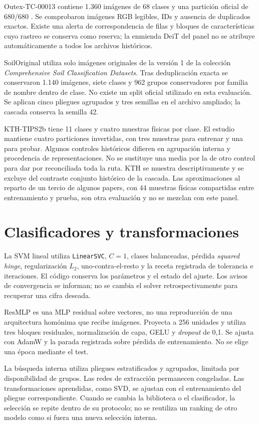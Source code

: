 Outex-TC-00013 contiene 1.360 imágenes de 68 clases y una partición oficial de 680/680 \citep{ojala2002outex}. Se comprobaron imágenes RGB legibles, IDs y ausencia de duplicados exactos. Existe una alerta de correspondencia de filas y bloques de características cuyo rastreo se conserva como reserva; la enmienda DeiT del panel no se atribuye automáticamente a todos los archivos históricos.

SoilOriginal utiliza solo imágenes originales de la versión 1 de la colección \emph{Comprehensive Soil Classification Datasets}. Tras deduplicación exacta se conservaron 1.140 imágenes, siete clases y 962 grupos conservadores por familia de nombre dentro de clase. No existe un split oficial utilizado en esta evaluación. Se aplican cinco pliegues agrupados y tres semillas en el archivo ampliado; la cascada conserva la semilla 42.

KTH-TIPS2b tiene 11 clases y cuatro muestras físicas por clase. El estudio mantiene cuatro particiones invertidas, con tres muestras para entrenar y una para probar. Algunos controles históricos difieren en agrupación interna y procedencia de representaciones. No se sustituye una media por la de otro control para dar por reconciliada toda la ruta. KTH se muestra descriptivamente y se excluye del contraste conjunto histórico de la cascada. Las aproximaciones al reparto de un tercio de algunos papers, con 44 muestras físicas compartidas entre entrenamiento y prueba, son otra evaluación y no se mezclan con este panel.

\section{Clasificadores y transformaciones}
La SVM lineal utiliza \texttt{LinearSVC}, \(C=1\), clases balanceadas, pérdida \emph{squared hinge}, regularización \(L_2\), uno-contra-el-resto y la receta registrada de tolerancia e iteraciones. El código conserva los parámetros y el estado del ajuste. Los avisos de convergencia se informan; no se cambia el solver retrospectivamente para recuperar una cifra deseada.

ResMLP es una MLP residual sobre vectores, no una reproducción de una arquitectura homónima que recibe imágenes. Proyecta a 256 unidades y utiliza tres bloques residuales, normalización de capa, GELU y \emph{dropout} de 0,1. Se ajusta con AdamW y la parada registrada sobre pérdida de entrenamiento. No se elige una época mediante el test.

La búsqueda interna utiliza pliegues estratificados y agrupados, limitada por disponibilidad de grupos. Las redes de extracción permanecen congeladas. Las transformaciones aprendidas, como SVD, se ajustan con el entrenamiento del pliegue correspondiente. Cuando se cambia la biblioteca o el clasificador, la selección se repite dentro de su protocolo; no se reutiliza un ranking de otro modelo como si fuera una nueva selección interna.

